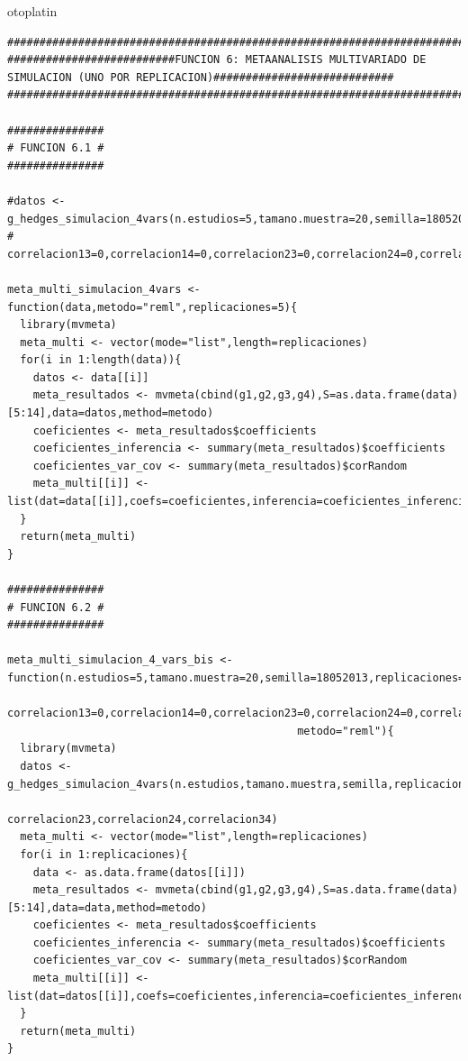 otoplatin\documentclass[a4paper,openright,12pt]{report}
\begin{document}
{\begin{verbatim}
##############################################################################################################################
##########################FUNCION 6: METAANALISIS MULTIVARIADO DE SIMULACION (UNO POR REPLICACION)############################
##############################################################################################################################

###############
# FUNCION 6.1 #
###############

#datos <- g_hedges_simulacion_4vars(n.estudios=5,tamano.muestra=20,semilla=18052013,replicaciones=5,correlacion12=0,
#                                   correlacion13=0,correlacion14=0,correlacion23=0,correlacion24=0,correlacion34=0)

meta_multi_simulacion_4vars <- function(data,metodo="reml",replicaciones=5){
  library(mvmeta)
  meta_multi <- vector(mode="list",length=replicaciones)
  for(i in 1:length(data)){
    datos <- data[[i]]
    meta_resultados <- mvmeta(cbind(g1,g2,g3,g4),S=as.data.frame(data)[5:14],data=datos,method=metodo)
    coeficientes <- meta_resultados$coefficients
    coeficientes_inferencia <- summary(meta_resultados)$coefficients
    coeficientes_var_cov <- summary(meta_resultados)$corRandom
    meta_multi[[i]] <- list(dat=data[[i]],coefs=coeficientes,inferencia=coeficientes_inferencia,var_cov=coeficientes_var_cov)
  }
  return(meta_multi)  
}

###############
# FUNCION 6.2 #
###############

meta_multi_simulacion_4_vars_bis <- function(n.estudios=5,tamano.muestra=20,semilla=18052013,replicaciones=5,correlacion12=0,
                                             correlacion13=0,correlacion14=0,correlacion23=0,correlacion24=0,correlacion34=0,
                                             metodo="reml"){
  library(mvmeta)
  datos <- g_hedges_simulacion_4vars(n.estudios,tamano.muestra,semilla,replicaciones,correlacion12,correlacion13,correlacion14,
                                     correlacion23,correlacion24,correlacion34)
  meta_multi <- vector(mode="list",length=replicaciones)
  for(i in 1:replicaciones){
    data <- as.data.frame(datos[[i]])
    meta_resultados <- mvmeta(cbind(g1,g2,g3,g4),S=as.data.frame(data)[5:14],data=data,method=metodo)
    coeficientes <- meta_resultados$coefficients
    coeficientes_inferencia <- summary(meta_resultados)$coefficients
    coeficientes_var_cov <- summary(meta_resultados)$corRandom
    meta_multi[[i]] <- list(dat=datos[[i]],coefs=coeficientes,inferencia=coeficientes_inferencia,var_cov=coeficientes_var_cov)
  }
  return(meta_multi)  
}
\end{verbatim}}
\end{document}
